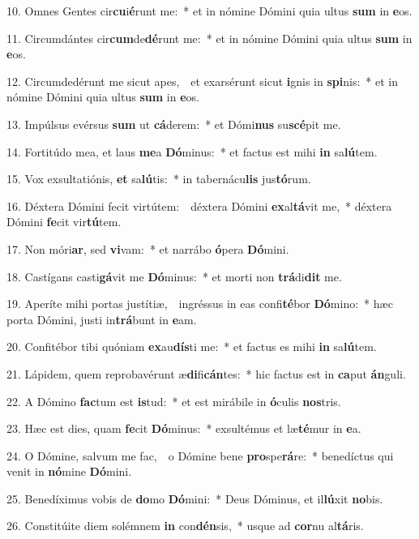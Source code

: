 10. Omnes Gentes cir\textbf{cu}i\textbf{é}runt me:~* et in nómine Dómini quia ultus \textbf{sum} in \textbf{e}os.

11. Circumdántes cir\textbf{cum}de\textbf{dé}runt me:~* et in nómine Dómini quia ultus \textbf{sum} in \textbf{e}os.

12. Circumdedérunt me sicut apes,~\GreDagger\ et exarsérunt sicut \textbf{i}gnis in \textbf{spi}nis:~* et in nómine Dómini quia ultus \textbf{sum} in \textbf{e}os.

13. Impúlsus evérsus \textbf{sum} ut \textbf{cá}derem:~* et Dómi\textbf{nus} su\textbf{scé}pit me.

14. Fortitúdo mea, et laus \textbf{me}a \textbf{Dó}minus:~* et factus est mihi \textbf{in} sa\textbf{lú}tem.

15. Vox exsultatiónis, \textbf{et} sa\textbf{lú}tis:~* in tabernácu\textbf{lis} jus\textbf{tó}rum.

16. Déxtera Dómini fecit virtútem:~\GreDagger\ déxtera Dómini \textbf{ex}al\textbf{tá}vit me,~* déxtera Dómini \textbf{fe}cit vir\textbf{tú}tem.

17. Non móri\textbf{ar}, sed \textbf{vi}vam:~* et narrábo \textbf{ó}pera \textbf{Dó}mini.

18. Castígans casti\textbf{gá}vit me \textbf{Dó}minus:~* et morti non \textbf{trá}di\textbf{dit} me.

19. Aperíte mihi portas justítiæ,~\GreDagger\ ingréssus in eas confi\textbf{té}bor \textbf{Dó}mino:~* hæc porta Dómini, justi in\textbf{trá}bunt in \textbf{e}am.

20. Confitébor tibi quóniam \textbf{ex}au\textbf{dís}ti me:~* et factus es mihi \textbf{in} sa\textbf{lú}tem.

21. Lápidem, quem reprobavérunt æ\textbf{di}fi\textbf{cán}tes:~* hic factus est in \textbf{ca}put \textbf{án}guli.

22. A Dómino \textbf{fac}tum est \textbf{is}tud:~* et est mirábile in \textbf{ó}culis \textbf{nos}tris.

23. Hæc est dies, quam \textbf{fe}cit \textbf{Dó}minus:~* exsultémus et læ\textbf{té}mur in \textbf{e}a.

24. O Dómine, salvum me fac,~\GreDagger\ o Dómine bene \textbf{pro}spe\textbf{rá}re:~* benedíctus qui venit in \textbf{nó}mine \textbf{Dó}mini.

25. Benedíximus vobis de \textbf{do}mo \textbf{Dó}mini:~* Deus Dóminus, et il\textbf{lú}xit \textbf{no}bis.

26. Constitúite diem solémnem \textbf{in} con\textbf{dén}sis,~* usque ad \textbf{cor}nu al\textbf{tá}ris.

